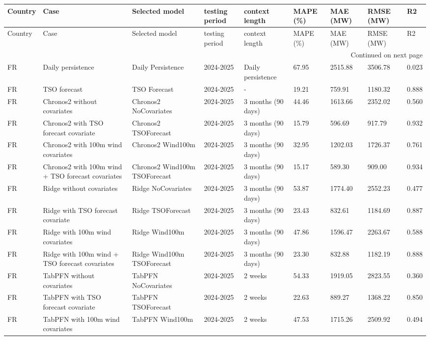 \begin{longtable}{lllllllll}
\toprule
Country & Case & Selected model & testing period & context length & MAPE (\%) & MAE (MW) & RMSE (MW) & R2 \\
\midrule
\endfirsthead
\toprule
Country & Case & Selected model & testing period & context length & MAPE (\%) & MAE (MW) & RMSE (MW) & R2 \\
\midrule
\endhead
\midrule
\multicolumn{9}{r}{Continued on next page} \\
\midrule
\endfoot
\bottomrule
\endlastfoot
FR & Daily persistence & Daily Persistence & 2024-2025 & Daily persistence & 67.95 & 2515.88 & 3506.78 & 0.023 \\
FR & TSO forecast & TSO Forecast & 2024-2025 & - & 19.21 & 759.91 & 1180.32 & 0.888 \\
FR & Chronos2 without covariates & Chronos2 NoCovariates & 2024-2025 & 3 months (90 days) & 44.46 & 1613.66 & 2352.02 & 0.560 \\
FR & Chronos2 with TSO forecast covariate & Chronos2 TSOForecast & 2024-2025 & 3 months (90 days) & 15.79 & 596.69 & 917.79 & 0.932 \\
FR & Chronos2 with 100m wind covariates & Chronos2 Wind100m & 2024-2025 & 3 months (90 days) & 32.95 & 1202.03 & 1726.37 & 0.761 \\
FR & Chronos2 with 100m wind + TSO forecast covariates & Chronos2 Wind100m TSOForecast & 2024-2025 & 3 months (90 days) & 15.17 & 589.30 & 909.00 & 0.934 \\
FR & Ridge without covariates & Ridge NoCovariates & 2024-2025 & 3 months (90 days) & 53.87 & 1774.40 & 2552.23 & 0.477 \\
FR & Ridge with TSO forecast covariate & Ridge TSOForecast & 2024-2025 & 3 months (90 days) & 23.43 & 832.61 & 1184.69 & 0.887 \\
FR & Ridge with 100m wind covariates & Ridge Wind100m & 2024-2025 & 3 months (90 days) & 47.86 & 1596.47 & 2263.67 & 0.588 \\
FR & Ridge with 100m wind + TSO forecast covariates & Ridge Wind100m TSOForecast & 2024-2025 & 3 months (90 days) & 23.30 & 832.88 & 1182.19 & 0.888 \\
FR & TabPFN without covariates & TabPFN NoCovariates & 2024-2025 & 2 weeks & 54.33 & 1919.05 & 2823.55 & 0.360 \\
FR & TabPFN with TSO forecast covariate & TabPFN TSOForecast & 2024-2025 & 2 weeks & 22.63 & 889.27 & 1368.22 & 0.850 \\
FR & TabPFN with 100m wind covariates & TabPFN Wind100m & 2024-2025 & 2 weeks & 47.53 & 1715.26 & 2509.92 & 0.494 \\

\end{longtable}
